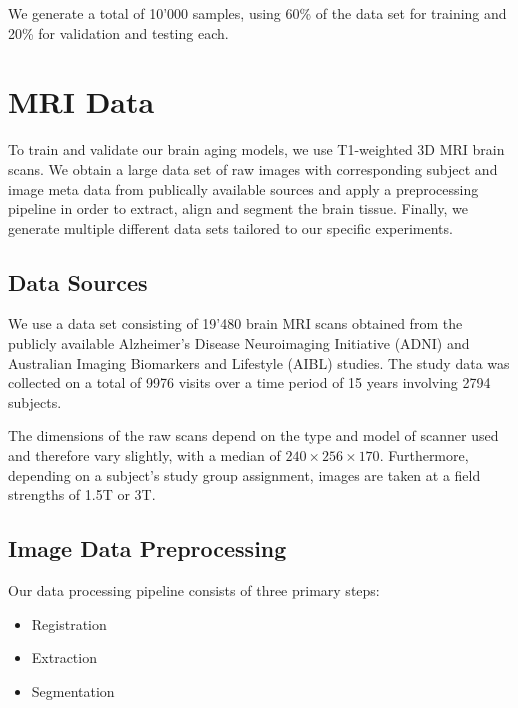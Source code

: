 We generate a total of 10'000 samples, using 60\% of the data set for training and 20\% for validation and testing each.

\section{MRI Data}
To train and validate our brain aging models, we use T1-weighted 3D MRI brain scans. We obtain a large data set of raw images with corresponding subject and image meta data from publically available sources and apply a preprocessing pipeline in order to extract, align and segment the brain tissue. Finally, we generate multiple different data sets tailored to our specific experiments.

\subsection{Data Sources}
We use a data set consisting of 19'480 brain MRI scans obtained from the publicly available Alzheimer's Disease Neuroimaging Initiative (ADNI) \cite{jack2008alzheimer} and Australian Imaging Biomarkers and Lifestyle (AIBL) \cite{ellis2009australian} studies. The study data was collected on a total of 9976 visits over a time period of 15 years involving 2794 subjects.

The dimensions of the raw scans depend on the type and model of scanner used and therefore vary slightly, with a median of $ 240 \times 256 \times 170 $. Furthermore, depending on a subject's study group assignment, images are taken at a field strengths of 1.5T or 3T.

\subsection{Image Data Preprocessing}
Our data processing pipeline consists of three primary steps:

\begin{itemize}
\item Registration
\item Extraction
\item Segmentation
\end{itemize}


